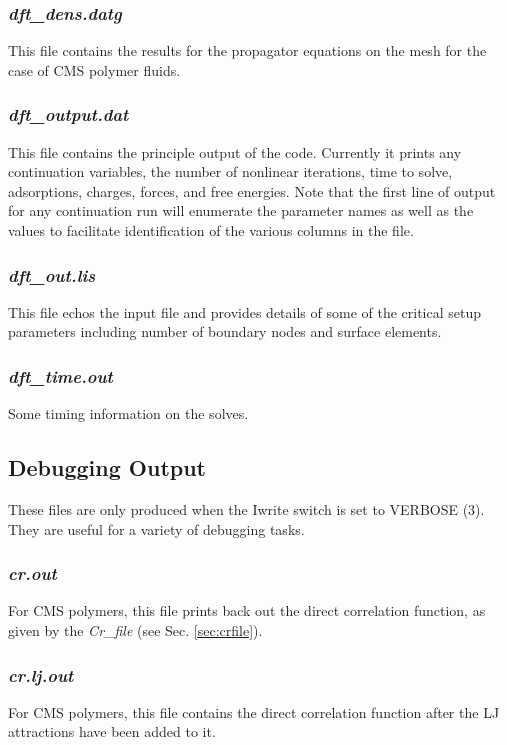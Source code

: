 \documentclass[10pt,onecolumn]{article}
\begin{document}
\subsubsection{{\it dft\_dens.datg}}  This file contains the results for the propagator
equations on the mesh for the case of CMS polymer fluids.

\subsubsection{{\it dft\_output.dat}}  This file contains the principle output of the
code.  Currently it prints any continuation variables, the number of nonlinear iterations, time to solve, adsorptions, charges, forces, and free energies.
Note that the first line of output for any continuation run will enumerate the parameter
names as well as the values to facilitate identification of the various columns in the file.

\subsubsection{{\it dft\_out.lis}}  This file echos the input file and provides details
of some of the critical setup parameters including number of boundary nodes 
and surface elements.

\subsubsection{{\it dft\_time.out}}
Some timing information on the solves.


\subsection{Debugging Output}
These files are only produced when the Iwrite switch is set to VERBOSE (3).  They
are useful for a variety of debugging tasks.

\subsubsection{{\it cr.out}}
For CMS polymers, this file prints back out the direct correlation function, as given by the {\it Cr\_file} (see Sec. \ref{sec:crfile}).

\subsubsection{{\it cr.lj.out}}
For CMS polymers, this file contains the direct correlation function after the LJ attractions have been added to it.
\end{document}
